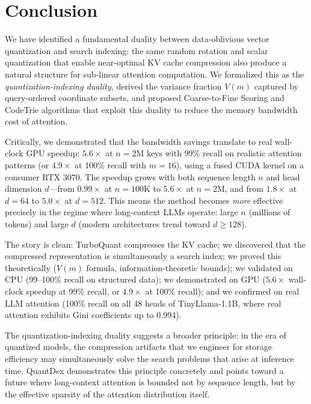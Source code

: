 \documentclass[10pt,twocolumn]{article}
\theoremstyle{definition}
\begin{document}
\section{Conclusion}
\label{sec:conclusion}

We have identified a fundamental duality between data-oblivious vector
quantization and search indexing: the same random rotation and scalar
quantization that enable near-optimal KV cache compression also produce a
natural structure for sub-linear attention computation.  We formalized this as
the \emph{quantization-indexing duality}, derived the variance fraction $V(m)$
captured by query-ordered coordinate subsets, and proposed Coarse-to-Fine Scoring
and CodeTrie algorithms that exploit this duality to reduce the memory bandwidth
cost of attention.

Critically, we demonstrated that the bandwidth savings translate to real
wall-clock GPU speedup: $5.6\times$ at $n = 2$M keys with 99\% recall on
realistic attention patterns (or $4.9\times$ at 100\% recall with $m = 16$),
using a fused CUDA kernel on a consumer RTX 3070.
The speedup grows with both sequence length $n$ and head dimension $d$---from
$0.99\times$ at $n = 100$K to $5.6\times$ at $n = 2$M, and from $1.8\times$ at
$d = 64$ to $5.0\times$ at $d = 512$.  This means the method becomes
\emph{more} effective precisely in the regime where long-context LLMs operate:
large $n$ (millions of tokens) and large $d$ (modern architectures trend toward
$d \geq 128$).

The story is clean: TurboQuant compresses the KV cache; we discovered that the
compressed representation is simultaneously a search index; we proved this
theoretically ($V(m)$ formula, information-theoretic bounds); we validated on CPU
(99--100\% recall on structured data); we demonstrated on GPU ($5.6\times$
wall-clock speedup at 99\% recall, or $4.9\times$ at 100\% recall); and we
confirmed on real LLM attention (100\% recall on all 48 heads of TinyLlama-1.1B,
where real attention exhibits Gini coefficients up to 0.994).

The quantization-indexing duality suggests a broader principle: in the era of
quantized models, the compression artifacts that we engineer for storage
efficiency may simultaneously solve the search problems that arise at inference
time.  QuantDex demonstrates this principle concretely and points toward a future
where long-context attention is bounded not by sequence length, but by the
effective sparsity of the attention distribution itself.
\end{document}

